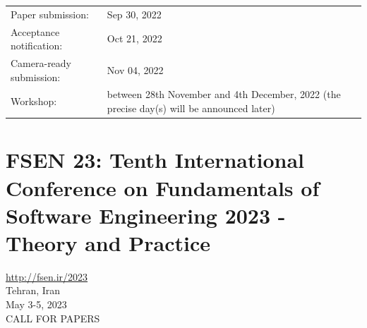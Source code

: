 \documentclass[prodmode,acmtecs]{acmsmall} %
\begin{document}
\begin{itemize}
\begin{tabulary}{\linewidth}{LL}Paper submission:  & Sep 30, 2022 \\
Acceptance notification:  & Oct 21, 2022 \\
Camera-ready submission:  & Nov 04, 2022 \\
Workshop:  & between 28th November and 4th December, 2022 (the precise day(s) will be announced later) \\
\end{tabulary}
 
\end{itemize}\section{FSEN 23: Tenth International Conference on Fundamentals of Software Engineering 2023 - Theory and Practice}\label{FSEN23}  \href{http://fsen.ir/2023}{http://fsen.ir/2023}\\ 
  Tehran, Iran\\ 
  May 3-5, 2023\\ 
CALL FOR PAPERS 
\end{document}
